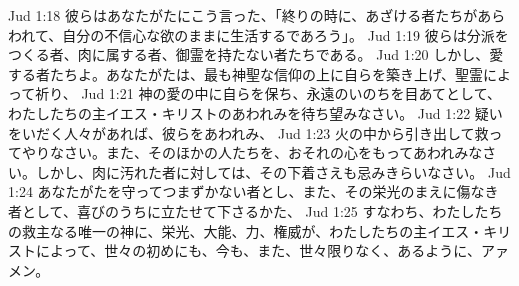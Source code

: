 Jud 1:18  彼らはあなたがたにこう言った、「終りの時に、あざける者たちがあらわれて、自分の不信心な欲のままに生活するであろう」。
Jud 1:19  彼らは分派をつくる者、肉に属する者、御霊を持たない者たちである。
Jud 1:20  しかし、愛する者たちよ。あなたがたは、最も神聖な信仰の上に自らを築き上げ、聖霊によって祈り、
Jud 1:21  神の愛の中に自らを保ち、永遠のいのちを目あてとして、わたしたちの主イエス・キリストのあわれみを待ち望みなさい。
Jud 1:22  疑いをいだく人々があれば、彼らをあわれみ、
Jud 1:23  火の中から引き出して救ってやりなさい。また、そのほかの人たちを、おそれの心をもってあわれみなさい。しかし、肉に汚れた者に対しては、その下着さえも忌みきらいなさい。
Jud 1:24  あなたがたを守ってつまずかない者とし、また、その栄光のまえに傷なき者として、喜びのうちに立たせて下さるかた、
Jud 1:25  すなわち、わたしたちの救主なる唯一の神に、栄光、大能、力、権威が、わたしたちの主イエス・キリストによって、世々の初めにも、今も、また、世々限りなく、あるように、アァメン。



